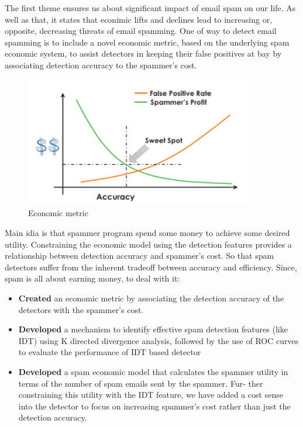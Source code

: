 \documentclass[10pt,a4paper]{article}
\begin{document}
The first theme ensures us about significant impact of email spam on our life. As well as that, it states that econimic lifts and declines lead to increasing or, opposite, decreasing threats of email spamming. One of way to detect email spamming is to include a novel economic metric, based on the underlying spam economic system, to assist detectors in keeping their false positives at bay by associating detection accuracy to the spammer’s cost.  

\begin{figure}[hhh!]
	\begin{center}
		\includegraphics[width=10cm]{img/eco_metric}
	\end{center}
	\vspace{-5mm}\caption{Economic metric}
\end{figure}

Main idia is that spammer program spend some money to achieve some desired utility. Constraining the economic model using the detection features provides a relationship between detection accuracy and spammer’s cost. So that spam detectors suffer from the inherent tradeoff between accuracy and efficiency. Since, spam is all about earning money, to deal with it:
\begin{itemize}
	\item \textbf{Created} an economic metric by associating the detection accuracy of the detectors with the spammer’s cost.
	\item \textbf{Developed} a mechanism to identify effective spam detection features (like IDT) using K directed divergence analysis, followed by the use of ROC curves to evaluate the performance of IDT based detector
	\item \textbf{Developed} a spam economic model that calculates the spammer utility in terms of the number of spam emails sent by the spammer. Fur- ther constraining this utility with the IDT feature, we have added a cost sense into the detector to focus on increasing spammer’s cost rather than just the detection accuracy.
\end{itemize}
\end{document}
